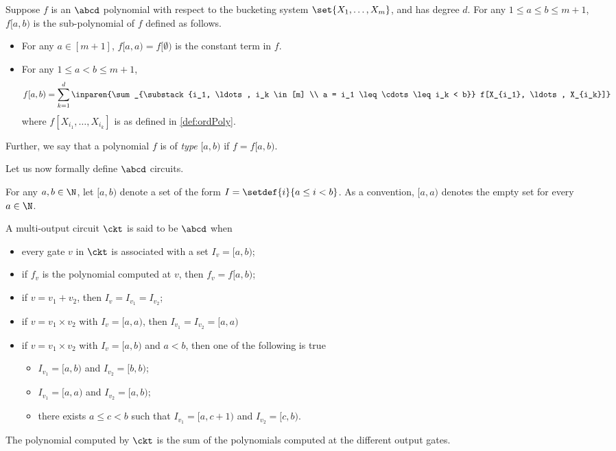 \begin{definition}\label{def:subPoly-of-OrdPoly}
	Suppose $f$ is an $\abcd$ polynomial with respect to the bucketing system $\set{X_1, \ldots, X_m}$, and has degree $d$. For any $1 \leq a \leq b \leq m+1$, $f[a,b)$ is the sub-polynomial of $f$ defined as follows.
	\begin{itemize}
		\item For any $a \in [m+1]$, $f[a, a) = f[\emptyset)$ is the constant term in $f$.
		\item For any $1 \leq a < b \leq m+1$,
		\[
			f[a,b) = \sum_{k=1}^{d} \inparen{\sum_{\substack{i_1, \ldots, i_k \in [m] \\ a = i_1 \leq \cdots \leq i_k < b}} f[X_{i_1}, \ldots, X_{i_k}]}	
		\]
		where $f[X_{i_1}, \ldots, X_{i_k}]$ is as defined in \autoref{def:ordPoly}.
	\end{itemize}
	Further, we say that a polynomial $f$ is of \emph{type} $[a,b)$ if $f = f[a,b)$.
\end{definition}

\noindent Let us now formally define $\abcd$ circuits.
%
%

\begin{definition}\label{def:ordCkt}
	For any $a, b \in \N$, let $[a,b)$ denote a set of the form $I = \setdef{i}{a \leq i < b}$. 
	As a convention, $[a,a)$ denotes the empty set for every $a \in \N$. 
	
	A multi-output circuit $\ckt$ is said to be $\abcd$ when
	\begin{itemize}
		\item every gate $v$ in $\ckt$ is associated with a set $I_v = [a,b)$;
		\item if $f_v$ is the polynomial computed at $v$, then $f_v = f[a, b)$;
		\item if $v = v_1 + v_2$, then $I_v = I_{v_1} = I_{v_2}$;
		\item if $v = v_1 \times v_2$ with $I_v = [a, a)$, then $I_{v_1} = I_{v_2} = [a,a)$
		\item  if $v = v_1 \times v_2$ with $I_v = [a, b)$ and $a < b$, then one of the following is true
		\begin{itemize}
			\item $I_{v_1} = [a,b)$ and $I_{v_2} = [b,b)$;
			\item $I_{v_1} = [a,a)$ and $I_{v_2} = [a,b)$;
			\item there exists $a \leq c < b$ such that $I_{v_1} = [a, c+1)$ and $I_{v_2} = [c, b)$.
		\end{itemize} 
	\end{itemize}
	The polynomial computed by $\ckt$ is the sum of the polynomials computed at the different output gates.
\end{definition}

